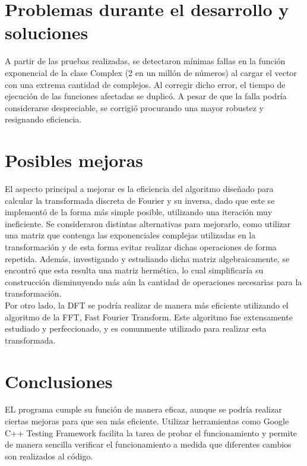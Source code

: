\documentclass[12pt,a4paper]{report}
\begin{document}
	\section{Problemas durante el desarrollo y soluciones}
		
        \indent A partir de las pruebas realizadas, se detectaron mínimas fallas en la función exponencial de la clase Complex (2 en
        un millón de números) al cargar el vector con una extrema cantidad de complejos. Al corregir dicho error, el tiempo de 
        ejecución de las funciones afectadas se duplicó. A pesar de que la falla podría considerarse despreciable, se corrigió procurando
        una mayor robustez y resignando eficiencia.   

	\section{Posibles mejoras}

		\indent El aspecto principal a mejorar es la eficiencia del algoritmo diseñado para calcular la transformada discreta de Fourier
		y su inversa, dado que este se implementó de la forma más simple posible, utilizando una iteración muy ineficiente. Se consideraron 
		distintas alternativas para mejorarlo, como utilizar una matriz que contenga las exponenciales complejas utilizadas en la transformación
		y de esta forma evitar realizar dichas operaciones de forma repetida. Además, investigando y estudiando dicha matriz algebraicamente, se
		encontró que esta resulta una matriz hermética, lo cual simplificaría su construcción disminuyendo más aún la cantidad de operaciones
		necesarias para la transformación.
		\\
		\indent	Por otro lado, la DFT se podría realizar de manera más eficiente utilizando el algoritmo de la FFT, Fast Fourier Transform. Este 
		algoritmo fue extensamente estudiado y perfeccionado, y es comunmente utilizado para realizar esta transformada.  

	\section{Conclusiones}
	
		\indent	EL programa cumple su función de manera eficaz, aunque se podría realizar ciertas mejoras para que sea más eficiente. Utilizar
		herramientas como Google C++ Testing Framework facilita la tarea de probar el funcionamiento y permite de manera sencilla verificar el
		funcionamiento a medida que diferentes cambios son realizados al código.
\end{document}
